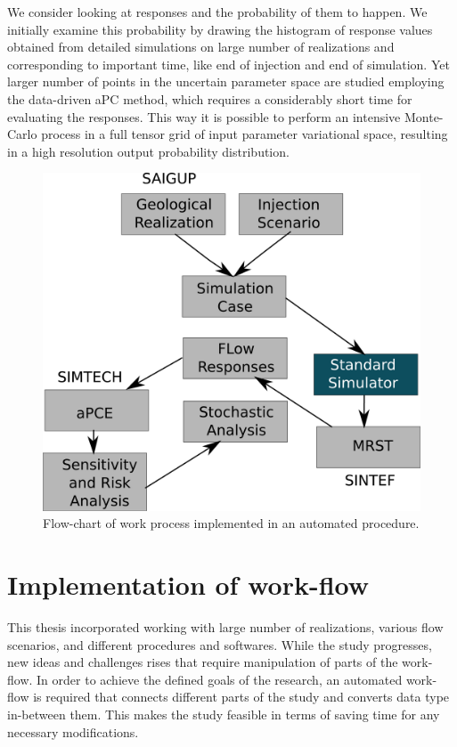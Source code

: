 We consider looking at responses and the probability of them to happen. We
initially examine this probability by drawing the histogram of response values
obtained from detailed simulations on large number of realizations and
corresponding to important time, like end of injection and end of simulation.
Yet larger number of points in the uncertain parameter space are studied
employing the data-driven aPC method, which requires a considerably short time
for evaluating the responses. This way it is possible to perform an intensive
Monte-Carlo process in a full tensor grid of input parameter variational space,
resulting in a high resolution output probability distribution.


\begin{figure}[thb]
  \centering
  \includegraphics[width=0.65 \linewidth]{./figurer/ENCL} 
  \caption{Flow-chart of work process implemented in an automated procedure.}
  \label{fig:encl}
%
\end{figure}

\section{Implementation of work-flow}
\label{sec:ImplementationWorkFlow}

This thesis incorporated working with large number of realizations, various flow
scenarios, and different procedures and softwares. While the study progresses,
new ideas and challenges rises that require manipulation of parts of the
work-flow. In order to achieve the defined goals of the research, an automated
work-flow is required that connects different parts of the study and converts
data type in-between them. This makes the study feasible in terms of saving time
for any necessary modifications.

